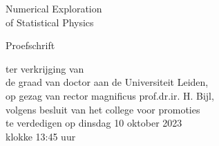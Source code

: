 \begin{titlepage} %

	\begin{center}
	
	\vspace*{\baselineskip} %
	
	
	
	
	{\huge  Numerical Exploration \\ of Statistical Physics \\} %
	
	
	
	
	
	
	\vspace*{4\baselineskip} %
	{\Large Proefschrift} 
	
	
	\vspace{6\baselineskip} %
	
    
    {\large ter verkrijging van \\ de graad van doctor aan de Universiteit Leiden, \\ op gezag van rector magnificus prof.dr.ir. H. Bijl, \\ volgens besluit van het college voor promoties \\ te verdedigen op dinsdag 10 oktober 2023 \\ klokke 13:45 uur} %
	

\end{center}
\end{titlepage}
